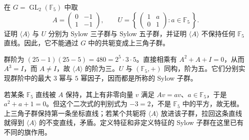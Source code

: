\begin{exercise}\label{b5:ex:F-nondefining-sylow}
	在 \(G=\operatorname{GL}_2(\mathbb F_5)\) 中取
	\[
		A=\begin{pmatrix}0&-1\\1&-1\end{pmatrix},\qquad
		U=\left\{\,\begin{pmatrix}1&a\\0&1\end{pmatrix}:a\in\mathbb F_5\,\right\}.
	\]
	证明 \(\langle A\rangle\) 与 \(U\) 分别为 Sylow 三子群与 Sylow 五子群，并证明 \(\langle A\rangle\) 不保持任何 \(\mathbb F_5\) 直线。因此，它不能通过 \(G\) 中的共轭变成上三角子群。
\end{exercise}
\begin{solution}
	群阶为 \((25-1)(25-5)=480=2^5\cdot3\cdot5\)。直接相乘有 \(A^2+A+I=0\)，从而 \(A^3=I\)，而 \(A\ne I\)，故 \(\langle A\rangle\) 的阶为三。\(U\) 与 \((\mathbb F_5,+)\) 同构，阶为五。它们分别实现群阶中的最大 \(3\) 幂与 \(5\) 幂因子，因而都是所称的 Sylow 子群。

	若某条 \(\mathbb F_5\) 直线被 \(A\) 保持，其上有非零向量 \(v\) 满足 \(Av=av\)、\(a\in\mathbb F_5\)，于是 \(a^2+a+1=0\)。但这个二次式的判别式为 \(-3=2\)，不是 \(\mathbb F_5\) 中的平方，故无根。上三角子群保持第一条坐标直线；若某个共轭将 \(\langle A\rangle\) 放进该子群，拉回这条直线就得到 \(\langle A\rangle\) 的不变直线，矛盾。定义特征和非定义特征的 Sylow 子群在这里已有不同的旗作用。
\end{solution}

